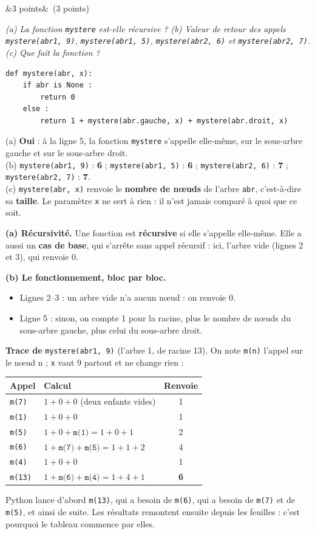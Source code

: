 \documentclass[11pt, a4paper]{exam}
\newcommand{\code}[1]{\texttt{#1}}
\newcommand{\Q}[3]{\par\needspace{5\baselineskip}\bigskip\noindent{\large\bfseries Question #1}\ifx&#2&\else\ \textnormal{(#2)}\fi\par\nopagebreak\smallskip\noindent\textit{#3}\par\nopagebreak\smallskip}
\begin{document}
\Q{5}{3 points}{(a) La fonction \code{mystere} est-elle récursive ? (b) Valeur de retour des appels \code{mystere(abr1, 9)}, \code{mystere(abr1, 5)}, \code{mystere(abr2, 6)} et \code{mystere(abr2, 7)}. (c) Que fait la fonction ?}
\begin{lstlisting}
def mystere(abr, x):
    if abr is None :
        return 0
    else :
        return 1 + mystere(abr.gauche, x) + mystere(abr.droit, x)
\end{lstlisting}
\begin{reponse}
(a) \textbf{Oui} : à la ligne 5, la fonction \code{mystere} s'appelle elle-même, sur le sous-arbre gauche et sur le sous-arbre droit. \\
(b) \code{mystere(abr1, 9)} : \textbf{6} ; \code{mystere(abr1, 5)} : \textbf{6} ; \code{mystere(abr2, 6)} : \textbf{7} ; \code{mystere(abr2, 7)} : \textbf{7}. \\
(c) \code{mystere(abr, x)} renvoie le \textbf{nombre de nœuds} de l'arbre \code{abr}, c'est-à-dire sa \textbf{taille}. Le paramètre \code{x} ne sert à rien : il n'est jamais comparé à quoi que ce soit.
\end{reponse}
\textbf{(a) Récursivité.} Une fonction est \textbf{récursive} si elle s'appelle elle-même. Elle a aussi un \textbf{cas de base}, qui s'arrête sans appel récursif : ici, l'arbre vide (lignes 2 et 3), qui renvoie 0.

\textbf{(b) Le fonctionnement, bloc par bloc.}
\begin{itemize}
\item Lignes 2--3 : un arbre vide n'a aucun nœud : on renvoie 0.
\item Ligne 5 : sinon, on compte 1 pour la racine, plus le nombre de nœuds du sous-arbre gauche, plus celui du sous-arbre droit.
\end{itemize}
\textbf{Trace de} \code{mystere(abr1, 9)} (l'arbre 1, de racine 13). On note \code{m(n)} l'appel sur le nœud n ; \code{x} vaut 9 partout et ne change rien :
\begin{center}
\renewcommand{\arraystretch}{1.2}
\begin{tabular}{|l|l|c|}
\hline
\textbf{Appel} & \textbf{Calcul} & \textbf{Renvoie} \\ \hline
\code{m(7)} & $1 + 0 + 0$ (deux enfants vides) & 1 \\
\code{m(1)} & $1 + 0 + 0$ & 1 \\
\code{m(5)} & $1 + 0 + \code{m(1)} = 1 + 0 + 1$ & 2 \\
\code{m(6)} & $1 + \code{m(7)} + \code{m(5)} = 1 + 1 + 2$ & 4 \\
\code{m(4)} & $1 + 0 + 0$ & 1 \\
\code{m(13)} & $1 + \code{m(6)} + \code{m(4)} = 1 + 4 + 1$ & \textbf{6} \\ \hline
\end{tabular}
\end{center}
Python lance d'abord \code{m(13)}, qui a besoin de \code{m(6)}, qui a besoin de \code{m(7)} et de \code{m(5)}, et ainsi de suite. Les résultats remontent ensuite depuis les feuilles : c'est pourquoi le tableau commence par elles.
\end{document}
